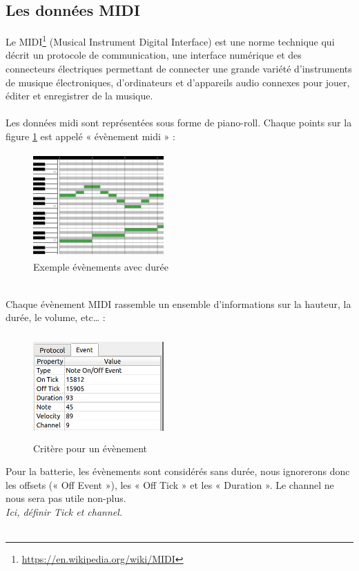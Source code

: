\subsection*{Les données MIDI}
Le MIDI\footnote{\url{https://en.wikipedia.org/wiki/MIDI}} (Musical Instrument Digital Interface) est une norme technique qui décrit un protocole de communication, une interface numérique et des connecteurs électriques permettant de connecter une grande variété d'instruments de musique électroniques, d'ordinateurs et d'appareils audio connexes pour jouer, éditer et enregistrer de la musique.\\\\
Les données midi sont représentées sous forme de piano-roll. Chaque points sur la figure \ref{piano_roll} est appelé « évènement midi » :
\begin{figure}[!h]
	\centering
	\includegraphics[height=40mm, width=50mm]{z_images/2_midi/exemple_midi_piano.jpg}
	\caption{Exemple évènements avec durée}
	\label{piano_roll}
\end{figure}\\
Chaque évènement MIDI rassemble un ensemble d’informations sur la hauteur, la durée, le volume, etc… :
\begin{figure}[h!]
	\centering
	\includegraphics[height=40mm, width=50mm]{z_images/2_midi/representation_numerique_1.png}
	\caption{Critère pour un évènement}
\end{figure}\newpage
Pour la batterie, les évènements sont considérés sans durée, nous ignorerons donc les offsets (« Off Event »), les « Off Tick » et les « Duration ». Le channel ne nous sera pas utile non-plus.\\
\textit{Ici, définir Tick et channel.}\\\\
